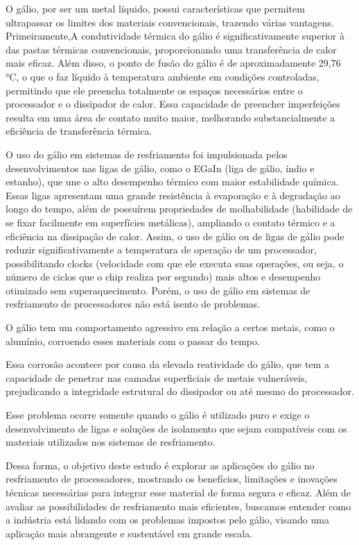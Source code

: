 \documentclass[12pt]{article}
\begin{document}
O gálio, por ser um metal líquido, possui características que permitem ultrapassar os limites dos materiais convencionais, trazendo várias vantagens. Primeiramente,A condutividade térmica do gálio é significativamente superior à das pastas térmicas convencionais, proporcionando uma transferência de calor mais eficaz. Além disso, o ponto de fusão do gálio é de aproximadamente 29,76 °C, o que o faz líquido à temperatura ambiente em condições controladas, permitindo que ele preencha totalmente os espaços necessários entre o processador e o dissipador de calor. Essa capacidade de preencher imperfeições resulta em uma área de contato muito maior, melhorando substancialmente a eficiência de transferência térmica.

O uso do gálio em sistemas de resfriamento foi impulsionada pelos desenvolvimentos nas ligas de gálio, como o EGaIn (liga de gálio, índio e estanho), que une o alto desempenho térmico com maior estabilidade química. Essas ligas apresentam uma grande resistência à evaporação e à degradação ao longo do tempo, além de possuírem propriedades de molhabilidade (habilidade de se fixar facilmente em superfícies metálicas), ampliando o contato térmico e a eficiência na dissipação de calor. Assim, o uso de gálio ou de ligas de gálio pode reduzir significativamente a temperatura de operação de um processador, possibilitando clocks (velocidade com que ele executa suas operações, ou seja, o número de ciclos que o chip realiza por segundo) mais altos e desempenho otimizado sem superaquecimento.
Porém, o uso de gálio em sistemas de resfriamento de processadores não está isento de problemas. 

O gálio tem um comportamento agressivo em relação a certos metais, como o alumínio, corroendo esses materiais com o passar do tempo. 

Essa corrosão acontece por causa da elevada reatividade do gálio, que tem a capacidade de penetrar nas camadas superficiais de metais vulneráveis, prejudicando a integridade estrutural do dissipador ou até mesmo do processador. 

Esse problema ocorre somente quando o gálio é utilizado puro e exige o desenvolvimento de ligas e soluções de isolamento que sejam compatíveis com os materiais utilizados nos sistemas de resfriamento.

Dessa forma, o objetivo deste estudo é explorar as aplicações do gálio no resfriamento de processadores, mostrando os benefícios, limitações e inovações técnicas necessárias para integrar esse material de forma segura e eficaz. Além de avaliar as possibilidades de resfriamento mais eficientes, buscamos entender como a indústria está lidando com os problemas impostos pelo gálio, visando uma aplicação mais abrangente e sustentável em grande escala.
\end{document}
